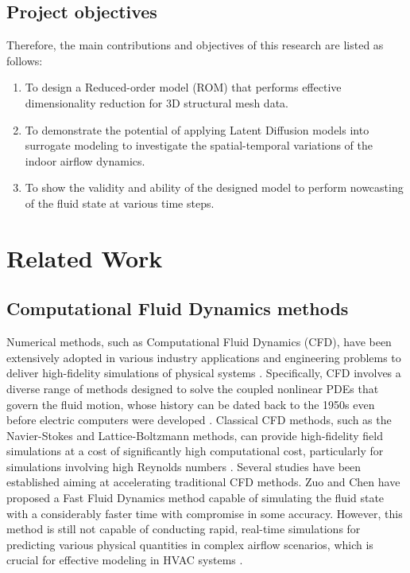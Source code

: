 \documentclass[final-report]{article-template}
\begin{document}
\subsection{Project objectives}
Therefore, the main contributions and objectives of this research are listed as follows:
\begin{enumerate}
    \item To design a Reduced-order model (ROM) that performs effective dimensionality reduction for 3D structural mesh data.  
    \item To demonstrate the potential of applying Latent Diffusion models into surrogate modeling to investigate the spatial-temporal variations of the indoor airflow dynamics.
    \item To show the validity and ability of the designed model to perform nowcasting of the fluid state at various time steps.
\end{enumerate}

\section{Related Work}

\subsection{Computational Fluid Dynamics methods}
Numerical methods, such as Computational Fluid Dynamics (CFD), have been extensively adopted in various industry applications and engineering problems to deliver high-fidelity simulations of physical systems \cite{Lassila2014}. Specifically, CFD involves a diverse range of methods designed to solve the coupled nonlinear PDEs that govern the fluid motion, whose history can be dated back to the 1950s even before electric computers were developed \cite{Bhattacharyya21}. Classical CFD methods, such as the Navier-Stokes and Lattice-Boltzmann methods, can provide high-fidelity field simulations at a cost of significantly high computational cost, particularly for simulations involving high Reynolds numbers \cite{shu2023physics}. Several studies have been established aiming at accelerating traditional CFD methods. Zuo and Chen \cite{zuo2010fast} have proposed a Fast Fluid Dynamics method capable of simulating the fluid state with a considerably faster time with compromise in some accuracy. However, this method is still not capable of conducting rapid, real-time simulations for predicting various physical quantities in complex airflow scenarios, which is crucial for effective modeling in HVAC systems \cite{shu2023physics}.
\end{document}
